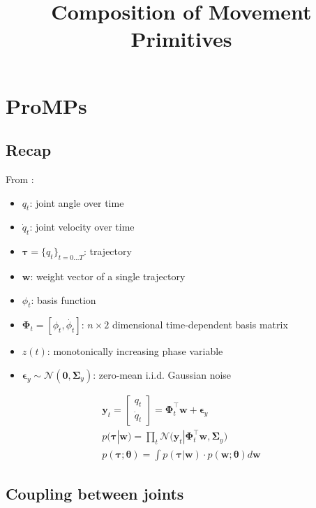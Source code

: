 \documentclass{article}
\title{Composition of Movement Primitives}
\begin{document}
\maketitle


\tableofcontents

\section{ProMPs}
\subsection{Recap}
From \citep{paraschos_probabilistic_2013, paraschos_using_2018}:
\begin{itemize}
    \item $q_t$: joint angle over time
    \item $\dot{q}_t$: joint velocity over time
    \item $\bm{\tau} = \{q_t\}_{t=0\dots T}$: trajectory
    \item $\bm{w}$: weight vector of a single trajectory
    \item $\phi_t$: basis function
    \item $\bm{\Phi}_t = [\phi_t, \dot{\phi_t}]$: $n \times 2$ dimensional time-dependent basis matrix
    \item $z(t)$: monotonically increasing phase variable
    \item $\bm{\epsilon}_y \sim \mathcal{N}(\bm{0}, \bm{\Sigma}_y)$: zero-mean i.i.d. Gaussian noise
\end{itemize}

\begin{gather}
\bm{y}_t = \begin{bmatrix}
       q_t \\[0.3em]
       \dot{q}_t
     \end{bmatrix} = \bm{\Phi}^{\top}_{t}\bm{w} + \bm{\epsilon}_y\\
p(\bm{\tau}|\bm{w}) = \prod_t \mathcal{N}\Big(\bm{y}_t|\bm{\Phi}^{\top}_{t}\bm{w}, \bm{\Sigma}_y \Big)\\
p(\bm{\tau};\bm{\theta}) = \int p(\bm{\tau}|\bm{w}) \cdot p(\bm{w};\bm{\theta}) d\bm{w}
\end{gather}

\subsection{Coupling between joints}
\end{document}
